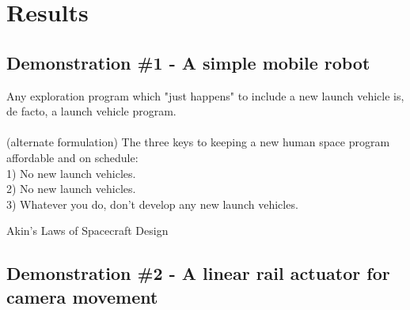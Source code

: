 \chapter{Results}
\label{ch:results}

\section{Demonstration \#1 - A simple mobile robot}
\label{sec:dem1}

\epigraph{
    Any exploration program which "just happens" to include a new launch vehicle is, de facto, a launch vehicle program. \\ \\
    (alternate formulation) The three keys to keeping a new human space program affordable and on schedule: \\
1)  No new launch vehicles. \\
2)  No new launch vehicles. \\
3)  Whatever you do, don't develop any new launch vehicles.}{Akin's Laws of Spacecraft Design\cite{david_l_akin_akins_nodate}}

\section{Demonstration \#2 - A linear rail actuator for camera movement}
\label{sec:dem2}
